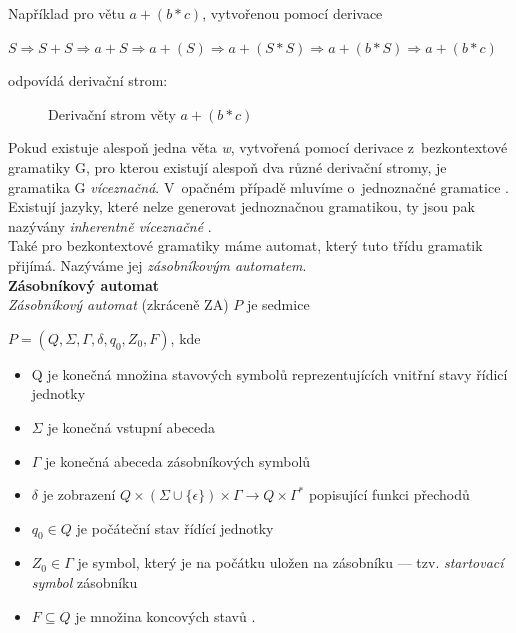 \Bat{} Například pro větu $a + (b * c)$, vytvořenou pomocí derivace 
\vspace*{\baselineskip}
\begin{center}  
$S \Rightarrow S + S \Rightarrow a + S \Rightarrow a + (S) \Rightarrow a + (S * S) \Rightarrow a + (b * S) \Rightarrow a + (b * c)$
\end{center}
\vspace*{\baselineskip}
odpovídá derivační strom:

\begin{figure}[H]
\centering
{}
\leaf{+}
\leaf{(}
\leaf{*}
\leaf{)}
\qobitree
\caption{Derivační strom věty $a + (b * c)$}
\label{fig:dtree}
\end{figure}

Pokud existuje alespoň jedna věta \textit{w}, vytvořená pomocí derivace z~bezkontextové gramatiky G, pro kterou existují alespoň dva různé derivační 
stromy, je gramatika G \textit{víceznačná}. V~opačném případě mluvíme o~jednoznačné gramatice \cite[str. 61]{TIN2013}. 
Existují jazyky, které nelze generovat jednoznačnou gramatikou, ty jsou pak nazývány \textit{inherentně víceznačné} 
\cite[str. 61]{TIN2013}. \\

Také pro bezkontextové gramatiky máme automat, který tuto třídu gramatik přijímá. Nazýváme jej \textit{zásobníkovým automatem}. \\

\textbf{Zásobníkový automat} \\
\textit{Zásobníkový automat} (zkráceně ZA) $P$ je sedmice
\begin{center}  
$P = (Q, \Sigma, \Gamma, \delta, q_0, Z_0, F)$, kde
\end{center}
\begin{itemize}
\item Q je konečná množina stavových symbolů reprezentujících vnitřní stavy řídicí \mbox{jednotky}
\item $\Sigma$ je konečná vstupní abeceda
\item $\Gamma$ je konečná abeceda zásobníkových symbolů
\item $\delta$ je zobrazení $Q \times (\Sigma \cup \{\epsilon\}) \times \Gamma \rightarrow Q \times \Gamma^*$ popisující funkci přechodů
\item $q_0 \in Q$ je počáteční stav řídící jednotky
\item $Z_0 \in \Gamma$ je symbol, který je na počátku uložen na zásobníku --- tzv. \textit{startovací symbol} zásobníku
\item $F \subseteq Q$ je množina koncových stavů \cite[str. 81]{TIN2013}.
\end{itemize}
\vspace*{\baselineskip} 

